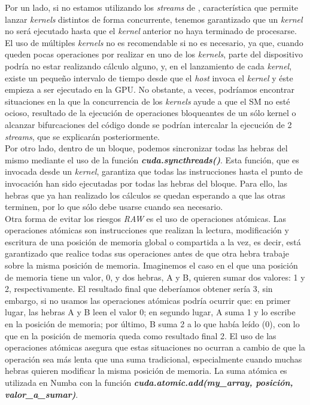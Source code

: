 Por un lado, si no estamos utilizando los \textit{streams} de \cudanospace, característica que permite lanzar \textit{kernels} distintos de forma concurrente, tenemos garantizado que un \textit{kernel} no será ejecutado hasta que el \textit{kernel} anterior no haya terminado de procesarse. El uso de múltiples \textit{kernels} no es recomendable si no es necesario, ya que, cuando queden pocas operaciones por realizar en uno de los \textit{kernels}, parte del dispositivo podría no estar realizando cálculo alguno, y, en el lanzamiento de cada \textit{kernel}, existe un pequeño intervalo de tiempo desde que el \textit{host} invoca el \textit{kernel} y éste empieza a ser ejecutado en la GPU. No obstante, a veces, podríamos encontrar situaciones en la que la concurrencia de los \textit{kernels} ayude a que el SM no esté ocioso, resultado de la ejecución de operaciones bloqueantes de un sólo kernel o alcanzar bifurcaciones del código donde se podrían intercalar la ejecución de 2 \textit{streams}, que se explicarán posteriormente.\\ 

Por otro lado, dentro de un bloque, podemos sincronizar todas las hebras del mismo mediante el uso de la función \textbf{\textit{cuda.syncthreads()}}. Esta función, que es invocada desde un \textit{kernel}, garantiza que todas las instrucciones hasta el punto de invocación han sido ejecutadas por todas las hebras del bloque. Para ello, las hebras que ya han realizado los cálculos se quedan esperando a que las otras terminen, por lo que sólo debe usarse cuando sea necesario.\\


Otra forma de evitar los riesgos \textit{RAW} es el uso de operaciones atómicas. Las operaciones atómicas son instrucciones que realizan la lectura, modificación y escritura de una posición de memoria global o compartida a la vez, es decir, está garantizado que realice todas sus operaciones antes de que otra hebra trabaje sobre la misma posición de memoria. Imaginemos el caso en el que una posición de memoria tiene un valor, 0, y dos hebras, A y B, quieren sumar dos valores: 1 y 2, respectivamente. El resultado final que deberíamos obtener sería 3, sin embargo, si no usamos las operaciones atómicas podría ocurrir que: en primer lugar, las hebras A y B leen el valor 0; en segundo lugar, A suma 1 y lo escribe en la posición de memoria; por último, B suma 2 a lo que había leído (0), con lo que en la posición de memoria queda como resultado final 2. El uso de las operaciones atómicas asegura que estas situaciones no ocurran a cambio de que la operación sea más lenta que una suma tradicional, especialmente cuando muchas hebras quieren modificar la misma posición de memoria. La suma atómica es utilizada en Numba con la función \textbf{\textit{cuda.atomic.add(my\_array, posición, valor\_a\_sumar)}}.


